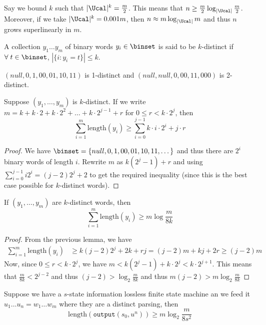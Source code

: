 \begin{remark}
Say we bound $k$ such that $|\Ucal|^k = \frac{m}{2}$. This means that $n \geq \frac{m}{2}\log_{|\Ucal|}\frac{m}{2}$. Moreover, if we take $|\Ucal|^k = 0.001m$, then $n \approx m\log_{|\Ucal|}m$ and thus $n$ grows superlinearly in $m$.
\end{remark}
\begin{definition}
A collection $y_1\dots y_m$ of binary words $y_i \in \binset$ is said to be $k$-distinct if $\forall\; t \in \binset$, $|\{i: y_i = t\}| \leq k$.
\end{definition}
\begin{eg}
$(null, 0, 1, 00, 01, 10, 11)$ is 1-distinct and $(null, null, 0, 00, 11, 000)$ is 2-distinct.
\end{eg}
\begin{lemma}
Suppose $(y_1, \dots, y_m)$ is $k$-distinct. If we write $m = k + k\cdot 2 + k \cdot 2^2 + \dots + k \cdot 2^{j-1} + r$ for $0 \leq r < k\cdot 2^j$, then
\[\sum_{i=1}^m \text{length}(y_i) \geq \sum_{i=0}^{j-1} k \cdot i \cdot 2^i + j\cdot r \]
\end{lemma}
\begin{proof}
We have $\binset = \{null, 0, 1, 00, 01, 10, 11, \dots\}$ and thus there are $2^i$ binary words of length $i$. Rewrite $m$ as $k(2^j -1 ) + r$ and using $\sum_{i=0}^{j-1} i 2^i = (j-2)2^j + 2$ to get the required inequality (since this is the best case possible for $k$-distinct words).
\end{proof}
\begin{corollary}
If $(y_1, \dots, y_m)$ are $k$-distinct words, then 
\[\sum_{i=1}^m \text{length}(y_i) \geq m \log \frac{m}{8k} \]
\end{corollary}
\begin{proof}
From the previous lemma, we have
\begin{align*}
    \sum_{i=1}^m \text{length}(y_i) &\geq k(j-2)2^j + 2k + rj = (j-2)m + kj + 2r \geq (j-2)m
\end{align*}
Now, since $0 \leq r < k \cdot 2^j$, we have $m < k (2^j-1)+k\cdot 2^j < k\cdot 2^{j+1}$. This means that $\frac{m}{8k} < 2^{j-2}$ and thus $(j-2) > \log_2\frac{m}{8k}$ and thus $m(j-2) > m\log_2 \frac{m}{8k}$
\end{proof}
\begin{theorem}
Suppose we have a $s$-state information lossless finite state machine an we feed it $u_1\dots u_n = w_1\dots w_m$ where they are a distinct parsing, then
\[\text{length}(\texttt{output}(s_0, u^n)) \geq m\log_2 \frac{m}{8s^2} \]
\end{theorem}
